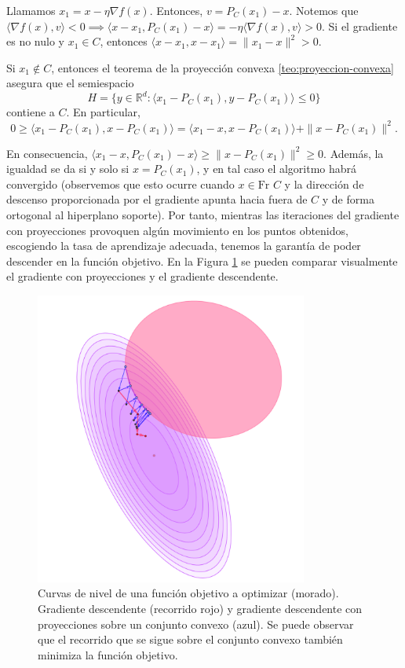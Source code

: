 Llamamos $x_1 = x - \eta \nabla f(x)$. Entonces, $v = P_C(x_1) - x$. Notemos que $\langle \nabla f(x), v \rangle < 0 \implies \langle x - x_1, P_C(x_1) - x \rangle = -\eta \langle \nabla f(x), v \rangle > 0$. Si el gradiente es no nulo y $x_1 \in C$, entonces $\langle x - x_1, x - x_1 \rangle = \|x_1 - x\|^2 > 0$. 

Si $x_1 \notin C$, entonces el teorema de la proyección convexa \ref{teo:proyeccion-convexa} asegura que el semiespacio 
\[
H = \{ y \in \mathbb{R}^d : \langle x_1 - P_C(x_1), y - P_C(x_1) \rangle \leq 0 \}
\]
contiene a $C$. En particular,
\[
0 \geq \langle x_1 - P_C(x_1), x - P_C(x_1) \rangle = \langle x_1 - x, x - P_C(x_1) \rangle + \|x - P_C(x_1)\|^2.
\]

\vspace{0.3cm}

En consecuencia, $\langle x_1 - x, P_C(x_1) - x \rangle \geq \|x - P_C(x_1)\|^2 \geq 0$. Además, la igualdad se da si y solo si $x = P_C(x_1)$, y en tal caso el algoritmo habrá convergido (observemos que esto ocurre cuando $x \in \text{Fr } C$ y la dirección de descenso proporcionada por el gradiente apunta hacia fuera de $C$ y de forma ortogonal al hiperplano soporte). Por tanto, mientras las iteraciones del gradiente con proyecciones provoquen algún movimiento en los puntos obtenidos, escogiendo la tasa de aprendizaje adecuada, tenemos la garantía de poder descender en la función objetivo.  En la Figura \ref{fig:convergencia} se pueden comparar visualmente el gradiente con proyecciones y el gradiente descendente.

\begin{figure}[!htbp]
    \centering
    \includegraphics[width=0.8\textwidth]{img/convergencia.png}
    \caption{Curvas de nivel de una función objetivo a optimizar (morado). Gradiente descendente (recorrido rojo) y gradiente descendente con proyecciones sobre un conjunto convexo (azul). Se puede observar que el recorrido que se sigue sobre el conjunto convexo también minimiza la función objetivo.}
    \label{fig:convergencia}
\end{figure}

